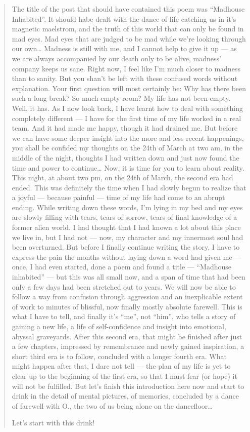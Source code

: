 \begin{quote}
The title of the post that should have contained this poem was \enquote{Madhouse Inhabited}. It should habe dealt with the dance of life catching us in it's magnetic maelstrom, and the truth of this world that can only be found in mad eyes. Mad eyes that are judged to be mad while we're looking through our own\dots{}
Madness is still with me, and I cannot help to give it up --- as we are always accompanied by our death only to be alive, madness' company keeps us sane. Right now, I feel like I'm much closer to madness than to sanity. But you shan't be left with these confused words without explanation. 
Your first question will most certainly be: Why has there been such a long break? So much empty room? 
My life has not been empty. Well, it has. As I now look back, I have learnt how to deal with something completely different --- I have for the first time of my life worked in a real team. And it had made me happy, though it had drained me. But before we can have some deeper insight into the more and less recent happenings, you shall be confided my thoughts on the 24th of March at two am, in the middle of the night, thoughts I had written down and just now found the time and power to continue\dots{} Now, it is time for you to learn about reality. 
This night, at about two pm, on the 24th of March, the second era had ended. This was definitely the time when I had slowly begun to realize that a joyful --- because painful --- time of my life had come to an abrupt ending. While writing down these words, I'm lying in my bed and my eyes are slowly filling with tears, tears of sorrow, tears of final knowledge of a former alien world. I had thought that I had known a lot about this place we live in, but I had not --- now, my character and my innermost soul had been overturned. But before I finally continue writing the story, I have to express the pain the months without laying down a word had given me --- once, I had even started, done a poem and found a title --- \enquote{Madhouse inhabited} --- but this was all small now, and a span of time that had been only a few days had been stretched out to years. We will now be able to follow a way from confusion through aggression and an inexplicable extent of work to minutes of blissful, now finally mostly absolute farewell. This is what I have to tell, and finally it's \enquote{me}, not \enquote{him}, who tells a story of gaining a new life, a life of self-confidence and insight into emotional, abyssal graveyards. After this second era, that might be finished after just a few chapters, impressed by remembrance and newly gained inspiration, a short third era is to follow, concluded with a longer fourth era. What might happen after that, I dare not tell --- the plan of my life is yet to clear up to the beginning of the first era, so that I must fear (or hope) it will not be fulfilled. But let's finish this introduction here now and start to drink in the detail of mental pictures, of memories, concluded by a dance of farewell with O., the two of us being alone on the dancefloor\dots{}

Let's start with this drink!
\end{quote}

